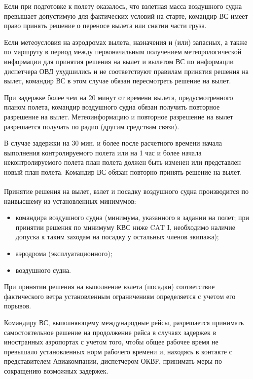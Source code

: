 Если при подготовке к полету оказалось, что взлетная масса воздушного судна превышает допустимую для фактических условий на старте, командир ВС имеет право принять решение о переносе вылета или снятии части груза.

Если метеоусловия на аэродромах вылета, назначения и (или) запасных, а также по маршруту в период между первоначальным получением метеорологической информации для принятия решения на вылет и вылетом ВС по информации диспетчера ОВД ухудшились и не соответствуют правилам принятия решения на вылет, командир ВС в этом случае обязан пересмотреть решение на вылет.

При задержке более чем на 20 минут от времени вылета, предусмотренного планом полета, командир воздушного судна обязан получить повторное разрешение на вылет. Метеоинформацию и повторное разрешение на вылет разрешается получать по радио (другим средствам связи).

В случае задержки на 30 мин. и более после расчетного времени начала выполнения контролируемого полета или на 1 час и более начала неконтролируемого полета план полета должен быть изменен или представлен новый план полета. Командир ВС обязан повторно принять решение на вылет.

\paragraph{} Принятие решения на вылет, взлет и посадку воздушного судна производится по наивысшему из установленных минимумов:  
\begin{itemize}
    \item командира воздушного судна (минимума, указанного в задании на полет; при принятии решения по минимуму КВС ниже CAT I, необходимо наличие допуска к таким заходам на посадку у остальных членов экипажа);
    \item аэродрома (эксплуатационного);
    \item воздушного судна.
\end{itemize}

При принятии решения на выполнение взлета (посадки) соответствие фактического ветра установленным ограничениям определяется с учетом его порывов.

Командиру ВС, выполняющему международные рейсы, разрешается принимать самостоятельное решение на продолжение рейса в случаях задержек в иностранных аэропортах с учетом того, чтобы общее рабочее время не превышало установленных норм рабочего времени и, находясь в контакте с представителем Авиакомпании, диспетчером ОКВР, принимать меры по сокращению возможных задержек.

